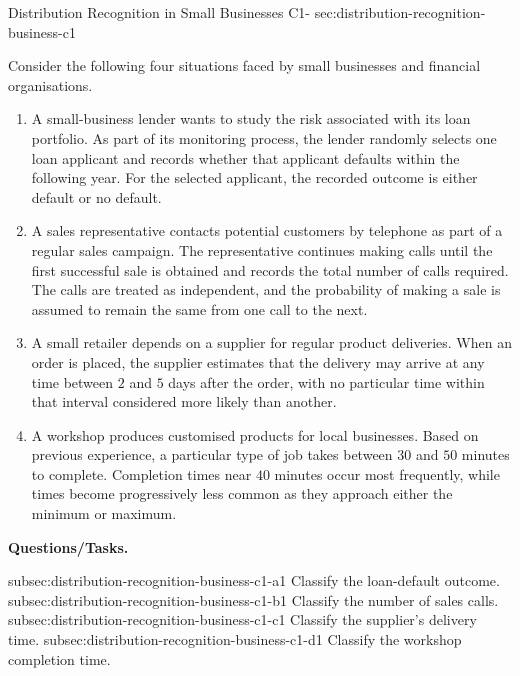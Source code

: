 	\sectionScored
	{Distribution Recognition in Small Businesses}
	{C1-}
	{sec:distribution-recognition-business-c1}
	{
		Consider the following four situations faced by small businesses and financial organisations.
		
		\begin{enumerate}
			\item A small-business lender wants to study the risk associated with its loan portfolio. As part of its monitoring process, the lender randomly selects one loan applicant and records whether that applicant defaults within the following year. For the selected applicant, the recorded outcome is either default or no default.
			
			\item A sales representative contacts potential customers by telephone as part of a regular sales campaign. The representative continues making calls until the first successful sale is obtained and records the total number of calls required. The calls are treated as independent, and the probability of making a sale is assumed to remain the same from one call to the next.
			
			\item A small retailer depends on a supplier for regular product deliveries. When an order is placed, the supplier estimates that the delivery may arrive at any time between $2$ and $5$ days after the order, with no particular time within that interval considered more likely than another.
			
			\item A workshop produces customised products for local businesses. Based on previous experience, a particular type of job takes between $30$ and $50$ minutes to complete. Completion times near $40$ minutes occur most frequently, while times become progressively less common as they approach either the minimum or maximum.
		\end{enumerate}
		
		\textbf{Questions/Tasks.}
		\begin{enumerate}
			\CriterionTask
			{subsec:distribution-recognition-business-c1-a}{1}
			{Classify the loan-default outcome. }
			\CriterionTask
			{subsec:distribution-recognition-business-c1-b}{1}
			{Classify the number of sales calls. }
			\CriterionTask
			{subsec:distribution-recognition-business-c1-c}{1}
			{Classify the supplier's delivery time. }
			\CriterionTask
			{subsec:distribution-recognition-business-c1-d}{1}
			{Classify the workshop completion time. }
		\end{enumerate}
		
}
